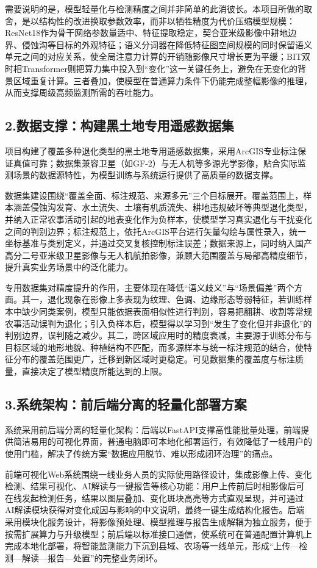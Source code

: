 需要说明的是，模型轻量化与检测精度之间并非简单的此消彼长。本项目所做的取舍，是以结构性的改进换取参数效率，而非以牺牲精度为代价压缩模型规模：ResNet18作为骨干网络参数量适中、特征提取稳定，契合亚米级影像中耕地边界、侵蚀沟等目标的外观特征；语义分词器在降低特征图空间规模的同时保留语义单元之间的对应关系，使全局注意力计算的开销随影像尺寸增长更为平缓；BIT双时相Transformer则把算力集中投入到“变化”这一关键任务上，避免在无变化的背景区域重复计算。三者叠加，使模型在普通算力条件下仍能完成整幅影像的推理，从而支撑周级高频监测所需的吞吐能力。

\subsection{2.数据支撑：构建黑土地专用遥感数据集}

项目构建了覆盖多种退化类型的黑土地专用遥感数据集，采用ArcGIS专业标注保证真值可靠；数据集兼容卫星（如GF-2）与无人机等多源光学影像，贴合实际监测场景的数据源特性，为模型训练与系统运行提供了高质量的数据支撑。

数据集建设围绕“覆盖全面、标注规范、来源多元”三个目标展开。覆盖范围上，样本涵盖侵蚀沟发育、水土流失、土壤有机质流失、耕地违规破坏等典型退化类型，并纳入正常农事活动引起的地表变化作为负样本，使模型学习真实退化与干扰变化之间的判别边界；标注规范上，依托ArcGIS平台进行矢量勾绘与属性录入，统一坐标基准与类别定义，并通过交叉复核控制标注误差；数据来源上，同时纳入国产高分二号亚米级卫星影像与无人机航拍影像，兼顾大范围覆盖与局部高精度细节，提升真实业务场景中的泛化能力。

专用数据集对精度提升的作用，主要体现在降低“语义歧义”与“场景偏差”两个方面。其一，退化现象在影像上多表现为纹理、色调、边缘形态等弱特征，若训练样本中缺少同类案例，模型只能依据表面相似性进行判别，容易把翻耕、收割等常规农事活动误判为退化；引入负样本后，模型得以学习到“发生了变化但并非退化”的判别边界，误判随之减少。其二，跨区域应用时的精度衰减，主要源于训练分布与目标区域的地形地貌、种植结构不匹配，而多源样本与统一标注规范的结合，使特征分布的覆盖范围更广，迁移到新区域时更稳定。可见数据集的覆盖度与标注质量，直接决定了模型精度所能达到的上限。

\subsection{3.系统架构：前后端分离的轻量化部署方案}

系统采用前后端分离的轻量化架构：后端以FastAPI支撑高性能批量处理，前端提供简洁易用的可视化界面，普通电脑即可本地化部署运行，有效降低了一线用户的使用门槛，解决了传统方案“数据应用脱节、难以形成闭环治理”的痛点。

前端可视化Web系统围绕一线业务人员的实际使用路径设计，集成影像上传、变化检测、结果可视化、AI解读与一键报告等核心功能：用户上传前后时相影像后可在线发起检测任务，结果以图层叠加、变化斑块高亮等方式直观呈现，并可通过AI解读模块获得对变化成因与影响的中文说明，最终一键生成结构化报告。后端采用模块化服务设计，将影像预处理、模型推理与报告生成解耦为独立服务，便于按需扩展算力与升级模型；前后端以标准接口通信，使系统可在普通配置计算机上完成本地化部署，将智能监测能力下沉到县域、农场等一线单元，形成“上传—检测—解读—报告—处置”的完整业务闭环。
